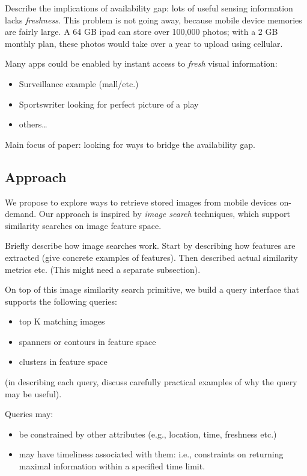 \documentclass[10pt]{article}
\begin{document}
Describe the implications of availability gap: lots of useful sensing
information lacks \emph{freshness}. This problem is not going away, because
mobile device memories are fairly large. A 64 GB ipad can store over
100,000 photos; with a 2 GB monthly plan, these photos would take over
a year to upload using cellular.

Many apps could be enabled by instant access to \emph{fresh} visual information:
\begin{itemize}
\item Surveillance example (mall/etc.)
\item Sportswriter looking for perfect picture of a play
\item others\ldots{}
\end{itemize}

Main focus of paper: looking for ways to bridge the availability gap.
\subsection{Approach}
\label{sec-2-2}


We propose to explore ways to retrieve stored images from mobile
devices on-demand. Our approach is inspired by \emph{image search}
techniques, which support similarity searches on image feature space.

Briefly describe how image searches work. Start by describing how
features are extracted (give concrete examples of features). Then
described actual similarity metrics etc. (This might need a separate
subsection).

On top of this image similarity search primitive, we build a query
interface that supports the following queries:
\begin{itemize}
\item top K matching images
\item spanners or contours in feature space
\item clusters in feature space
\end{itemize}
(in describing each query, discuss carefully practical examples of why
the query may be useful).

Queries may:
\begin{itemize}
\item be constrained by other attributes (e.g., location, time, freshness
  etc.)
\item may have timeliness associated with them: i.e.,  constraints on
  returning maximal information within a specified time limit.
\end{itemize}
\end{document}
